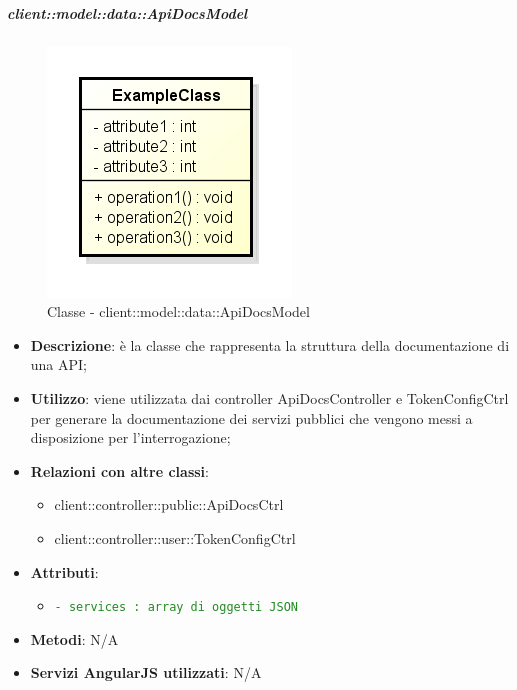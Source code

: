 		\subparagraph{client::model::data::ApiDocsModel} %
		\label{subp:client_model_data_apidocsmodel}
			\begin{figure}[htbp]
				\centering
				\centerline{\includegraphics[scale=0.7]{./images/client/classes/example_class.png}}
				\caption{Classe - client::model::data::ApiDocsModel}
			\end{figure}
			\begin{itemize}
				\item \textbf{Descrizione}: è la classe che rappresenta la struttura della documentazione di una API;
				\item \textbf{Utilizzo}: viene utilizzata dai controller ApiDocsController e TokenConfigCtrl per generare la documentazione dei servizi pubblici che vengono messi a disposizione per l'interrogazione;
				\item \textbf{Relazioni con altre classi}:
					\begin{itemize}
						\item client::controller::public::ApiDocsCtrl
						\item client::controller::user::TokenConfigCtrl
					\end{itemize}
				\item \textbf{Attributi}:
					\begin{itemize}
						\item \textcolor{forestgreen}{\texttt{- services : array di oggetti JSON}}
					\end{itemize}

				\item \textbf{Metodi}: N/A

				\item \textbf{Servizi AngularJS utilizzati}: N/A

			\end{itemize}


